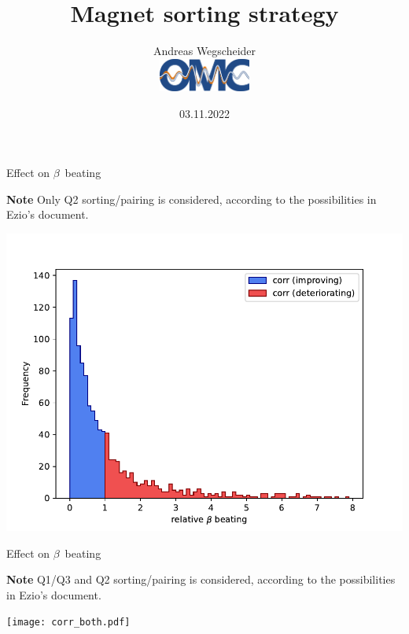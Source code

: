 \documentclass[usenames,dvipsnames,aspectratio=169,table]{beamer}
\author[awegsche]{%
Andreas Wegscheider\\[1em]
\centering%
\includegraphics[width=3cm]{OMC_logo_original.pdf}%
}
\title[Magnet sorting]{Magnet sorting strategy}
\institute{CERN}
\date[03.11.22]{03.11.2022}
\begin{document}
\begin{frame}
    \titlepage
\end{frame}





\begin{frame} %
    {Effect on $\beta$~beating}


    \textbf{Note} Only Q2 sorting/pairing is considered, according to the possibilities in Ezio's document.
    
    
    \includegraphics[width=0.45\linewidth]{corr_onlyQ2.pdf}


\end{frame} %


\begin{frame} %
    {Effect on $\beta$~beating}


    \textbf{Note} Q1/Q3 and Q2 sorting/pairing is considered, according to the possibilities in Ezio's document.
    
    
    \texttt{[image: corr\_both.pdf]}


\end{frame} %
\end{document}
